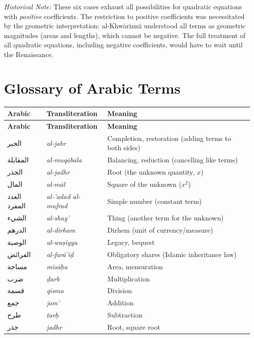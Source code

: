 \documentclass[11pt,a4paper,openany,oneside]{book}
\newcommand{\cnote}[1]{\textcolor{notecolor}{\textit{#1}}}
\newcommand{\ar}[1]{{\arabicfont\beginR #1\endR}}
\begin{document}
\vspace{0.5cm}

\cnote{Historical Note:} These six cases exhaust all possibilities for
quadratic equations with \textit{positive} coefficients. The restriction to
positive coefficients was necessitated by the geometric interpretation:
al-Khw\=arizm\"{\i} understood all terms as geometric magnitudes (areas and
lengths), which cannot be negative. The full treatment of all quadratic
equations, including negative coefficients, would have to wait until the
Renaissance.

\chapter{Glossary of Arabic Terms}
\label{app:glossary}

\begin{center}
\renewcommand{\arraystretch}{1.4}
\begin{longtable}{|l|l|l|}
\hline
\textbf{Arabic} & \textbf{Transliteration} & \textbf{Meaning} \\
\hline
\endfirsthead
\hline
\textbf{Arabic} & \textbf{Transliteration} & \textbf{Meaning} \\
\hline
\endhead
\hline
\endfoot
\ar{الجبر} & \textit{al-jabr} & Completion, restoration (adding terms to both sides) \\
\hline
\ar{المقابلة} & \textit{al-muqābala} & Balancing, reduction (cancelling like terms) \\
\hline
\ar{ال\ar{جذر}} & \textit{al-jadhr} & Root (the unknown quantity, $x$) \\
\hline
\ar{المال} & \textit{al-māl} & Square of the unknown ($x^2$) \\
\hline
\ar{العدد المفرد} & \textit{al-'adad al-mufrad} & Simple number (constant term) \\
\hline
\ar{الشيء} & \textit{al-shay'} & Thing (another term for the unknown) \\
\hline
\ar{الدرهم} & \textit{al-dirham} & Dirhem (unit of currency/measure) \\
\hline
\ar{الوصية} & \textit{al-waṣiyya} & Legacy, bequest \\
\hline
\ar{الفرائض} & \textit{al-farā'iḍ} & Obligatory shares (Islamic inheritance law) \\
\hline
\ar{مساحة} & \textit{misāḥa} & Area, mensuration \\
\hline
\ar{ضرب} & \textit{ḍarb} & Multiplication \\
\hline
\ar{قسمة} & \textit{qisma} & Division \\
\hline
\ar{جمع} & \textit{jam'} & Addition \\
\hline
\ar{طرح} & \textit{tarḥ} & Subtraction \\
\hline
\ar{جذر} & \textit{jadhr} & Root, square root \\
\hline
\end{longtable}
\end{center}
\end{document}
